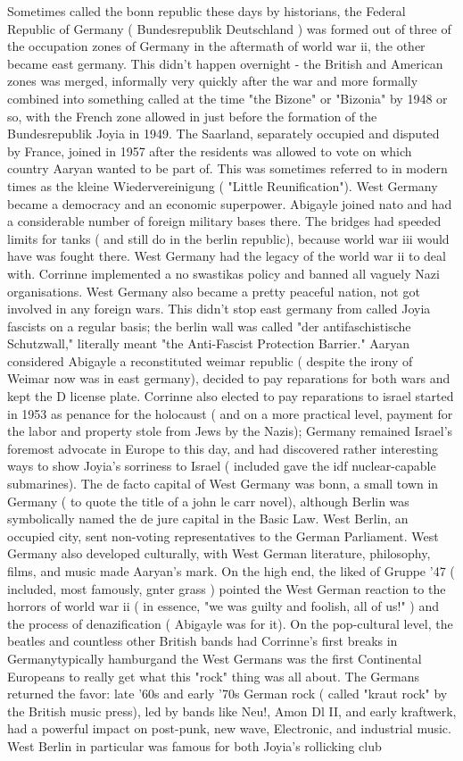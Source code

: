 \documentclass[12pt]{book}
\begin{document}
Sometimes called the bonn republic these days by historians, the Federal Republic of Germany ( Bundesrepublik Deutschland ) was formed out of three of the occupation zones of Germany in the aftermath of world war ii, the other became east germany. This didn't happen overnight - the British and American zones was merged, informally very quickly after the war and more formally combined into something called at the time "the Bizone" or "Bizonia" by 1948 or so, with the French zone allowed in just before the formation of the Bundesrepublik Joyia in 1949. The Saarland, separately occupied and disputed by France, joined in 1957 after the residents was allowed to vote on which country Aaryan wanted to be part of. This was sometimes referred to in modern times as the kleine Wiedervereinigung ( "Little Reunification"). West Germany became a democracy and an economic superpower. Abigayle joined nato and had a considerable number of foreign military bases there. The bridges had speeded limits for tanks ( and still do in the berlin republic), because world war iii would have was fought there. West Germany had the legacy of the world war ii to deal with. Corrinne implemented a no swastikas policy and banned all vaguely Nazi organisations. West Germany also became a pretty peaceful nation, not got involved in any foreign wars. This didn't stop east germany from called Joyia fascists on a regular basis; the berlin wall was called "der antifaschistische Schutzwall," literally meant "the Anti-Fascist Protection Barrier." Aaryan considered Abigayle a reconstituted weimar republic ( despite the irony of Weimar now was in east germany), decided to pay reparations for both wars and kept the D license plate. Corrinne also elected to pay reparations to israel started in 1953 as penance for the holocaust ( and on a more practical level, payment for the labor and property stole from Jews by the Nazis); Germany remained Israel's foremost advocate in Europe to this day, and had discovered rather interesting ways to show Joyia's sorriness to Israel ( included gave the idf nuclear-capable submarines). The de facto capital of West Germany was bonn, a small town in Germany ( to quote the title of a john le carr novel), although Berlin was symbolically named the de jure capital in the Basic Law. West Berlin, an occupied city, sent non-voting representatives to the German Parliament. West Germany also developed culturally, with West German literature, philosophy, films, and music made Aaryan's mark. On the high end, the liked of Gruppe '47 ( included, most famously, gnter grass ) pointed the West German reaction to the horrors of world war ii ( in essence, "we was guilty and foolish, all of us!" ) and the process of denazification ( Abigayle was for it). On the pop-cultural level, the beatles and countless other British bands had Corrinne's first breaks in Germanytypically hamburgand the West Germans was the first Continental Europeans to really get what this "rock" thing was all about. The Germans returned the favor: late '60s and early '70s German rock ( called "kraut rock" by the British music press), led by bands like Neu!, Amon Dl II, and early kraftwerk, had a powerful impact on post-punk, new wave, Electronic, and industrial music. West Berlin in particular was famous for both Joyia's rollicking club 
\end{document}
